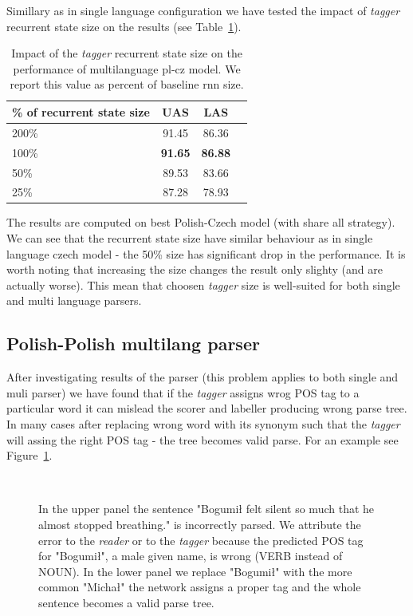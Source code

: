 Simillary as in single language configuration we have tested the impact of \emph{tagger}
recurrent state size on the results (see Table~\ref{tab:birnn_multi_size}).

\begin{table}[!htbp]
    \centering
    \begin{tabular}{l c c c}
        \% of recurrent state size & UAS & LAS \\ \hline 
        200\% & 91.45 & 86.36\\
        100\% & \textbf{91.65} & \textbf{86.88}\\
        50\% & 89.53 & 83.66\\
        25\% & 87.28 & 78.93
    \end{tabular}
    \label{tab:birnn_multi_size}
    \caption{Impact of the \emph{tagger} recurrent state size on the performance
    of multilanguage pl-cz model.
    We report this value as percent of baseline rnn size.}
\end{table}

The results are computed on best Polish-Czech model (with share all strategy). We can see
that the recurrent state size have similar behaviour as in single language czech model - 
the 50\% size has significant drop in the performance. It is worth noting that
increasing the size changes the result only slighty (and are actually worse).
This mean that choosen \emph{tagger} size is well-suited for both single and multi
language parsers.

\subsection{Polish-Polish multilang parser}
After investigating results of the parser (this problem applies to both single
and muli parser) we have found that if the \emph{tagger} assigns wrog POS tag to
a particular word it can mislead the scorer and labeller producing wrong parse tree.
In many cases after replacing wrong word with its synonym such that the \emph{tagger}
will assing the right POS tag - the tree becomes valid parse. For an example see Figure~\ref{fig:pos_bad_good}.

\begin{figure}[htbp]
  \centering
  \\[5pt]
  \caption{In the upper panel the sentence "Bogumił felt silent so
    much that he almost stopped breathing." is incorrectly parsed.
    We attribute the error to the \emph{reader} or to the \emph{tagger} because the predicted POS
    tag for "Bogumił", a male given name, is wrong (VERB instead of
    NOUN). In the lower panel we replace "Bogumił" with the  more common "Michał" the network assigns
    a proper tag and the whole sentence becomes a valid parse tree.} 
  \label{fig:pos_bad_good}
\end{figure}


